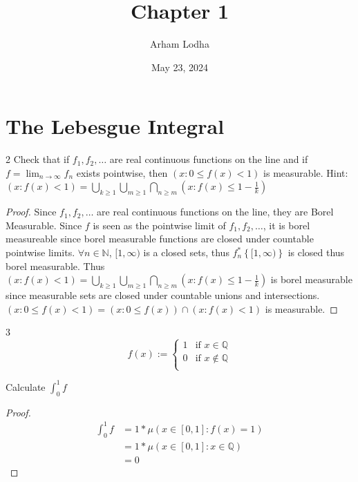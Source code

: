 \documentclass{article}
\newcommand{\Q}{\mathbb{Q}}
\newcommand{\N}{\mathbb{N}}
\begin{document}
\title{Chapter 1}
\author{Arham Lodha}%
\date{May 23, 2024}%
\maketitle

\section{The Lebesgue Integral}
\begin{PROB}{2}\label{Problem 2.}
    Check that if $f_1, f_2, \dots$ are real continuous functions on the line and if $f = \lim_{n \to \infty} f_n$ exists pointwise, then $(x: 0 \leq f(x) < 1)$ is measurable. Hint: $(x: f(x) < 1) = \bigcup_{k \geq 1} \bigcup_{m \geq 1} \bigcap_{n \geq m}(x: f(x) \leq 1 - \frac{1}{k})$     
\end{PROB}
\begin{proof}
    Since $f_1, f_2, \dots$ are real continuous functions on the line, they are Borel Measurable. Since $f$ is seen as the pointwise limit of $f_1, f_2, \dots$, it is borel measureable since borel measurable functions are closed under countable pointwise limits. $\forall n \in \N$, $[1, \infty)$ is a closed sets, thus $f^*_{n}\left\{ [1, \infty) \right\}$ is closed thus borel measurable. Thus $(x: f(x) < 1) = \bigcup_{k \geq 1} \bigcup_{m \geq 1} \bigcap_{n \geq m}(x: f(x) \leq 1 - \frac{1}{k})$ is borel measurable since measurable sets are closed under countable unions and intersections. $(x: 0 \leq f(x) < 1) = (x: 0 \leq f(x)) \cap (x : f(x) < 1)$ is measurable.    
\end{proof}

\bigskip

\begin{PROB}{3}\label{Problem 3.}
    \begin{equation*}
        f(x) := \begin{cases*}
            1 & \text{if $x \in \Q$} \\
            0 &  \text{if $x \not \in \Q$} \\
        \end{cases*}
    \end{equation*}

    Calculate $\int_{0}^1 f$ 
\end{PROB}
\begin{proof}
    \begin{align*}
        \int_{0}^1 f &= 1 * \mu(x \in [0, 1] : f(x) = 1) \\
        &= 1 * \mu(x \in [0, 1]: x \in \Q) \\
        &= 0
    \end{align*}
\end{proof}
\end{document}
